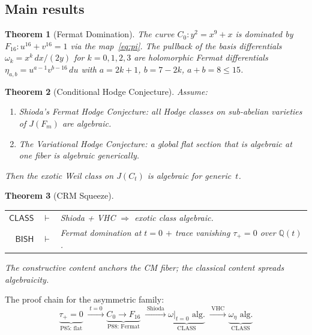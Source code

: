 \documentclass[11pt]{article}
\theoremstyle{plain}
\newtheorem{theorem}{Theorem}[section]
\theoremstyle{definition}
\theoremstyle{remark}
\newcommand{\Q}{\mathbb{Q}}
\newcommand{\BISH}{\ensuremath{\mathsf{BISH}}}
\newcommand{\CLASS}{\ensuremath{\mathsf{CLASS}}}
\begin{document}
\subsection{Main results}

\begin{theorem}[Fermat Domination]\label{thm:A}
The curve $C_0\colon y^2 = x^9 + x$ is dominated by
$F_{16}\colon u^{16} + v^{16} = 1$ via the map~\eqref{eq:pi}.
The pullback of the basis differentials
$\omega_k = x^k\,dx/(2y)$ for $k = 0,1,2,3$
are holomorphic Fermat differentials
$\eta_{a,b} = u^{a-1} v^{b-16}\,du$ with
$a = 2k+1$, $b = 7-2k$, $a + b = 8 \leq 15$.
\end{theorem}

\begin{theorem}[Conditional Hodge Conjecture]\label{thm:B}
Assume:
\begin{enumerate}[label=(\roman*)]
  \item \emph{Shioda's Fermat Hodge Conjecture:} all Hodge
    classes on sub-abelian varieties of $J(F_m)$ are algebraic.
  \item \emph{The Variational Hodge Conjecture:} a global flat
    section that is algebraic at one fiber is algebraic generically.
\end{enumerate}
Then the exotic Weil class on $J(C_t)$ is algebraic for generic~$t$.
\end{theorem}

\begin{theorem}[CRM Squeeze]\label{thm:C}
\begin{center}
\begin{tabular}{rcl}
$\CLASS$ & $\vdash$ & Shioda + VHC $\Rightarrow$
  exotic class algebraic.\\
$\BISH$ & $\vdash$ & Fermat domination at $t=0$
  $+$ trace vanishing $\tau_+ = 0$ over $\Q(t)$.
\end{tabular}
\end{center}
The constructive content anchors the CM fiber; the classical
content spreads algebraicity.
\end{theorem}

The proof chain for the asymmetric family:
\[
  \underbrace{\tau_+ = 0}_{\text{P85: flat}}
  \;\xrightarrow{\;t = 0\;}
  \underbrace{C_0 \to F_{16}}_{\text{P88: Fermat}}
  \;\xrightarrow{\;\text{Shioda}\;}
  \underbrace{\omega|_{t=0}\text{ alg.}}_{\text{CLASS}}
  \;\xrightarrow{\;\text{VHC}\;}
  \underbrace{\omega_\eta\text{ alg.}}_{\text{CLASS}}
\]

\end{document}
